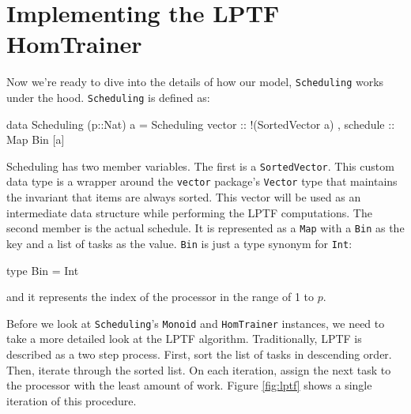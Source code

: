 \documentclass[tikz]{tmr}
\newcommand\h{\lstinline}
\newcommand\+{\mdoubleplus}
\begin{document}
\section{Implementing the LPTF HomTrainer}

Now we're ready to dive into the details of how our model, \h{Scheduling} works under the hood.
\h{Scheduling} is defined as:
\begin{spec}
data Scheduling (p::Nat) a = Scheduling
    { vector   :: !(SortedVector a)
    , schedule :: Map Bin [a]
    }
\end{spec}
Scheduling has two member variables.
The first is a \h{SortedVector}. %
This custom data type is a wrapper around the \h{vector} package's \h{Vector} type that maintains the invariant that items are always sorted.
This vector will be used as an intermediate data structure while performing the LPTF computations.
The second member is the actual schedule.
It is represented as a \h{Map} with a \h{Bin} as the key and a list of tasks as the value.
\h{Bin} is just a type synonym for \h{Int}:
\begin{spec}
type Bin = Int
\end{spec}
and it represents the index of the processor in the range of 1 to $p$.

Before we look at \h{Scheduling}'s \h{Monoid} and \h{HomTrainer} instances, we need to take a more detailed look at the LPTF algorithm.
Traditionally, LPTF is described as a two step process.
First, sort the list of tasks in descending order.
Then, iterate through the sorted list.
On each iteration, assign the next task to the processor with the least amount of work.
Figure \ref{fig:lptf} shows a single iteration of this procedure.
\end{document}
